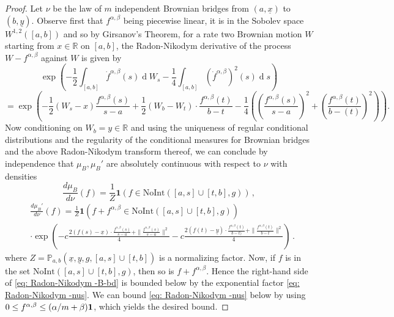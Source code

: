 \documentclass[11pt, reqno]{amsart}
\numberwithin{equation}{section}
\newcommand{\R}{\ensuremath{\mathbb{R}}}
\newcommand{\PP}{\ensuremath{\mathbb{P}}}
\newcommand{\diff}{\ensuremath{\operatorname{d}\!}}
\begin{document}
\begin{proof}
	Let $\nu$ be the law of $m$ independent Brownian bridges from $(a, \underline{x})$ to $(b, \underline{y})$. Observe first that $f^{\alpha, \beta}$ being piecewise linear, it is in the Sobolev space $W^{1,2}([a,b])$ and so by Girsanov's Theorem, for a rate two Brownian motion $W$ starting from $x\in \R$ on $[a, b]$, the Radon-Nikodym derivative of the process $W-f^{\alpha, \beta}$ against $W$ is given by
    \begin{equation*}
    \exp\left(-\frac{1}{2}\displaystyle\int_{[a,b]} \dot{f}^{\alpha, \beta}(s) \diff W_s - \frac{1}{4}\int_{[a,b]} (\dot{f}^{\alpha, \beta})^2(s) \diff s\right)
    \end{equation*}
    \begin{equation*}
     = \exp\left(-\frac{1}{2}(W_s-x)\frac{ f^{\alpha, \beta}(s)}{s-a} + \frac{1}{2}(W_{b}-W_{t})\cdot \frac{f^{\alpha, \beta}(t)}{b-t}  - \frac{1}{4}\left(\left(\frac{f^{\alpha, \beta}(s)}{s-a}\right)^2+ \left(\frac{f^{\alpha, \beta}(t)}{b-(t)}\right)^2\right)\right).
    \end{equation*}
    Now conditioning on $W_{b}=y\in \R$ and using the uniqueness of regular conditional distributions and the regularity of the conditional measures for Brownian bridges and the above Radon-Nikodym transform thereof, we can conclude by independence that $\mu_B, \mu_B'$ are absolutely continuous with respect to $\nu$ with densities
    \begin{equation*}
	\frac{d \mu_B}{d \nu}(f) = \frac{1}Z \mathbf{1}(f \in \mathrm{NoInt}([a, s] \cup [t, b], g))\,,
    \end{equation*}
    \begin{equation}
    \label{eq: Radon-Nikodym -nus}
    \begin{array}{cc}
	&\frac{d \mu_B'}{d \nu}(f) = \frac{1}{Z} \mathbf{1}(f + f^{\alpha, \beta} \in \mathrm{NoInt}([a, s] \cup [t, b], g)) \\
	&\displaystyle\cdot \exp \left(-c\frac{2 (f(s) -\underline{x}) \cdot \frac{f^{\alpha, \beta}(s)}{s-a} + \|\frac{f^{\alpha, \beta}(s)}{s-a}\|^2}{4} -c\frac{2 (f(t) -\underline{y}) \cdot \frac{f^{\alpha, \beta}(t)}{b-t)} + \| \frac{f^{\alpha, \beta}(t)}{b-t}\|^2}{4}\right)\,. 
	\end{array}
    \end{equation}
	where  $Z = \PP_{a, b}(\underline{x}, \underline{y}, g, [a, s] \cup [t, b])$ is a normalizing factor. Now, if $f$ is in the set $\mathrm{NoInt}([a, s] \cup [t, b], g)$, then so is $f + f^{\alpha, \beta}$. Hence the right-hand side of \eqref{eq: Radon-Nikodym -B-bd} is bounded below by the exponential factor \eqref{eq: Radon-Nikodym -nus}. We can bound \eqref{eq: Radon-Nikodym -nus} below by using $0 \le f^{\alpha, \beta} \le (\alpha/m + \beta) {\bf 1}$, which yields the desired bound.
\end{proof}
\end{document}
